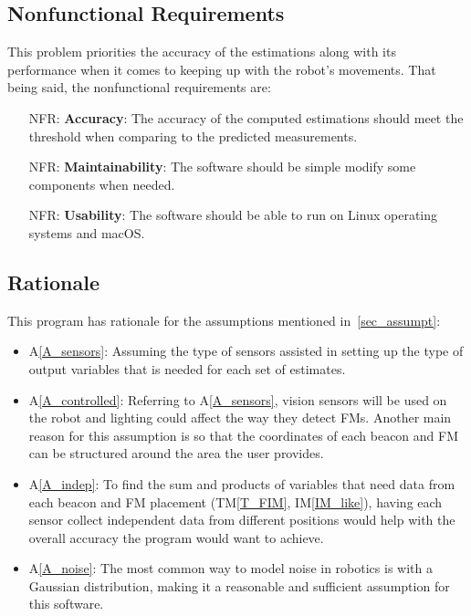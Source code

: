 \documentclass[12pt]{article}
\newcommand{\tref}[1]{TM\ref{#1}}
\newcommand{\aref}[1]{A\ref{#1}}
\newcommand{\iref}[1]{IM\ref{#1}}
\newcounter{nfrnum} %
\begin{document}
\subsection{Nonfunctional Requirements}

This problem priorities the accuracy of the estimations along with its performance when it comes to keeping up with the robot's movements. That being said, the nonfunctional requirements are:

\noindent \begin{itemize}

\item[NFR\refstepcounter{nfrnum}\thenfrnum \label{NFR_Accuracy}:]
  \textbf{Accuracy}: The accuracy of the computed estimations should meet the threshold when comparing to the predicted measurements. 

\item[NFR\refstepcounter{nfrnum}\thenfrnum \label{NFR_Maintainability}:]
  \textbf{Maintainability}: The software should be simple modify some components when needed.

\item[NFR\refstepcounter{nfrnum}\thenfrnum \label{NFR_Reusability}:]
  \textbf{Usability}: The software should be able to run on Linux operating systems and macOS.
\end{itemize}

\subsection{Rationale}

This program has rationale for the assumptions mentioned in~\ref{sec_assumpt}:
\begin{itemize}
  \item \aref{A_sensors}: Assuming the type of sensors assisted in setting up the type of output variables that is needed for each set of estimates.
  \item \aref{A_controlled}: Referring to \aref{A_sensors}, vision sensors will be used on the robot and lighting could affect the way they detect FMs. Another main reason for this assumption is so that the coordinates of each beacon and FM can be structured around the area the user provides.
  \item \aref{A_indep}: To find the sum and products of variables that need data from each beacon and FM placement (\tref{T_FIM}, \iref{IM_like}), having each sensor collect independent data from different positions would help with the overall accuracy the program would want to achieve.
  \item \aref{A_noise}: The most common way to model noise in robotics is with a Gaussian distribution, making it a reasonable and sufficient assumption for this software.
\end{itemize}
\end{document}
